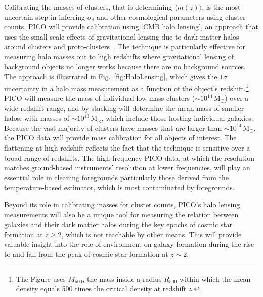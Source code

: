 \documentclass[PICOReport.tex]{subfiles}
\begin{document}
Calibrating the masses of clusters, that is determining $\langle m(z) \rangle$, is the most uncertain step in inferring $\sigma_{8}$ and other cosmological parameters using cluster counts.  PICO will provide calibration using `CMB halo lensing', an approach that uses the small-scale effects of gravitational lensing due to dark matter halos around clusters and proto-clusters~\citep{2015ApJ...806..247B, 2015PhRvL.114o1302M, 2016A&A...594A..24P}. The technique is particularly effective for measuring halo masses out to high redshifts where gravitational lensing of background objects no longer works because there are no background sources. 
The approach is illustrated in Fig.~\ref{fig:HaloLensing}, which gives the $1\sigma$ uncertainty in a halo mass measurement as a function of the object's redshift.\footnote{The Figure uses $M_{500}$, the mass inside a radius $R_{500}$ within which the mean density equals 500 times the critical density at redshift $z$.} PICO will measure the mass of individual low-mass clusters ($\sim 10^{14}$\,M$_\odot$) over a wide redshift range, and by stacking will determine the mean mass of smaller halos, with masses of $\sim 10^{13}$\,M$_\odot$, which include those hosting individual galaxies. Because the vast majority of clusters have masses that are larger than $\sim 10^{14}$\,M$_\odot$, the PICO data will provide mass calibration for all objects of interest. The flattening at high redshift reflects the fact that the technique is sensitive over a broad range of redshifts. The high-frequency PICO data, at which the resolution matches ground-based instruments' resolution at lower frequencies, will play an essential role in cleaning foregrounds particularly those derived from the temperature-based estimator, which is most contaminated by foregrounds. 

Beyond its role in calibrating masses for cluster counts, PICO's halo lensing measurements will also be a unique tool for measuring the relation between galaxies and their dark matter halos during the key epochs of cosmic star formation at $z\geq 2$, which is not reachable by other means.  This will provide valuable insight into the role of environment on galaxy formation during the rise to and fall from the peak of cosmic star formation at $z\sim 2$. 

\end{document}
